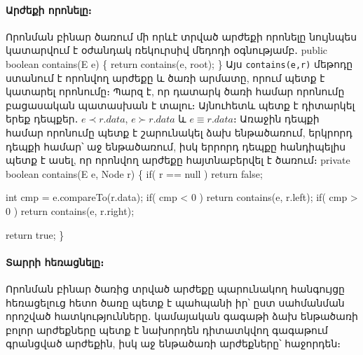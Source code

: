 \paragraph{Արժեքի որոնելը։}
Որոնման բինար ծառում մի որևէ տրված արժեքի որոնելը 
նույնպես կատարվում է օժանդակ ռեկուրսիվ մեդոդի օգնությամբ․
\nwenddocs{}\endmoddef{}
public boolean contains(E e)
\{
  return contains(e, root);
\}
\nwendcode{}\nwdocspar
Այս \texttt{contains(e,r)} մեթոդը ստանում է որոնվող արժեքը 
և ծառի արմատը, որում պետք է կատարել որոնումը։ Պարզ է, որ 
դատարկ ծառի համար որոնումը բացասական պատասխան է տալու։
Այնուհետև պետք է դիտարկել երեք դեպքեր․ \(e\prec r.data\),
\(e\succ r.data\) և \(e\equiv r.data\)։ Առաջին դեպքի 
համար որոնումը պետք է շարունակել ձախ ենթածառում, երկրորդ
դեպքի համար՝ աջ ենթածառում, իսկ երրորդ դեպքը հանդիպելիս
պետք է ասել, որ որոնվող արժեքը հայտնաբերվել է ծառում։  
\nwenddocs{}\plusendmoddef
private boolean contains(E e, Node r)
\{
  if( r == null )
    return false;

  int cmp = e.compareTo(r.data);
  if( cmp < 0 )
    return contains(e, r.left);
  if( cmp > 0 )
    return contains(e, r.right);

  return true;
\}
\nwendcode{}\nwdocspar


%
\paragraph{Տարրի հեռացնելը։}
Որոնման բինար ծառից տրված արժեքը պարունակող հանգույցը
հեռացելուց հետո ծառը պետք է պահպանի իր՝ ըստ սահմանման 
որոշված հատկությունները․ կամայական գագաթի ձախ ենթածառի
բոլոր արժեքները պետք է նախորդեն դիտատկվող գագաթում 
գրանցված արժեքին, իսկ աջ ենթածառի արժեքները՝ հաջորդեն։

